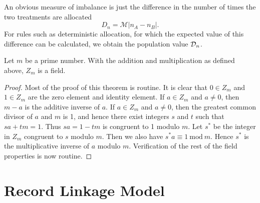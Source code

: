 An obvious measure of imbalance is just the difference in the
number of times the two treatments are allocated
\begin{equation}
D_n = \mathcal{M}|n_A - n_B|. \label{2deffD}
\end{equation}
For rules such as deterministic allocation, for which the expected
value of this difference can be calculated, we obtain the population
value ${\cal D}_n$.


\begin{theorem}\label{1th:Z_m}
Let $m$ be a prime number. With the addition and multiplication as 
defined above, $Z_m$ is a field.
\end{theorem}

\begin{proof}
Most of the proof of this theorem is routine.  It is clear that $0\in Z_m$ 
and $1\in Z_m$ are the 
zero element and identity element. If $a\in Z_m$ and $a\ne 0$, then $m-a$ 
is the additive inverse of $a$. If $a\in Z_m$ and $a\ne 0$, then the 
greatest common divisor of $a$ and $m$ is 1, and hence
there exist integers $s$ and $t$ such that $sa+tm=1$. Thus $sa=1 -tm$ is 
congruent to 1 modulo $m$. Let $s^*$ be the integer in $Z_m$ 
congruent to $s$ 
modulo $m$. Then we also have $s^*a\equiv 1\  \mbox{mod}\ m$. Hence $s^*$ 
is 
the multiplicative inverse of $a$ modulo $m$. Verification of the rest of 
the field properties is now routine.\end{proof}



\section{Record Linkage Model}\label{sec:reclinkage}

